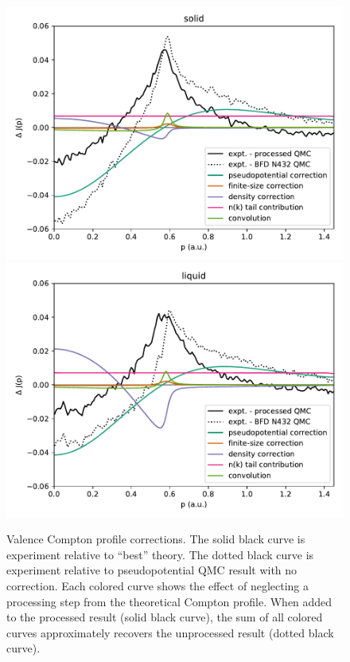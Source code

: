 \documentclass[aps,prb,showpacs,preprintnumbers,amsmath,amssymb,superscriptaddress,twocolumn]{revtex4-1}
\begin{document}
\begin{figure}
\includegraphics[width=\linewidth]{li58_solid-the-djp}
\includegraphics[width=\linewidth]{li58_liquid-the-djp}
\caption{Valence Compton profile corrections. The solid black curve is experiment relative to ``best'' theory. The dotted black curve is experiment relative to pseudopotential QMC result with no correction. Each colored curve shows the effect of neglecting a processing step from the theoretical Compton profile. When added to the processed result (solid black curve), the sum of all colored curves approximately recovers the unprocessed result (dotted black curve). \label{fig:sl-corrections}}
\end{figure}
\end{document}
